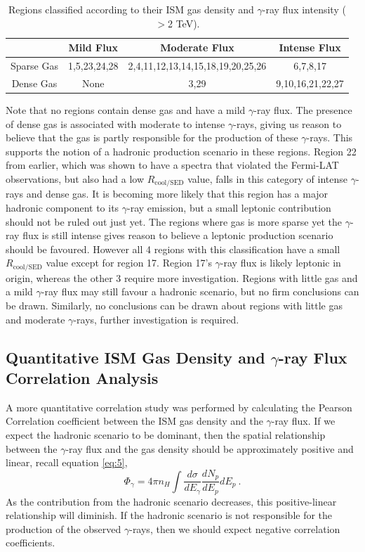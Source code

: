 \documentclass[12pt,a4paper]{article}
\begin{document}
\begin{table}[h] 
	\begin{center}
		\begin{tabular}{c|ccc}
			\toprule
			& Mild Flux  & Moderate Flux & Intense Flux \\
			\hline
			Sparse Gas &1,5,23,24,28&2,4,11,12,13,14,15,18,19,20,25,26&6,7,8,17\\
			Dense Gas & None & 3,29 & 9,10,16,21,22,27 \\
			\bottomrule
		\end{tabular} 
	\end{center}
	\caption{Regions classified according to their ISM gas density and $\gamma$-ray flux intensity ($>$2 TeV).}
	\label{tab:densgamclass}
\end{table}
Note that no regions contain dense gas and have a mild $\gamma$-ray flux. The presence of dense gas is associated with moderate to intense $\gamma$-rays, giving us reason to believe that the gas is partly responsible for the production of these $\gamma$-rays. This supports the notion of a hadronic production scenario in these regions. Region 22 from earlier, which was shown to have a spectra that violated the Fermi-LAT observations, but also had a low $R_{\mathrm{cool/SED}}$ value, falls in this category of intense $\gamma$-rays and dense gas. It is becoming more likely that this region has a major hadronic component to its $\gamma$-ray emission, but a small leptonic contribution should not be ruled out just yet. The regions where gas is more sparse yet the $\gamma$-ray flux is still intense gives reason to believe a leptonic production scenario should be favoured. However all 4 regions with this classification have a small $R_{\mathrm{cool/SED}}$ value except for region 17. Region 17's $\gamma$-ray flux is likely leptonic in origin, whereas the other 3 require more investigation. Regions with little gas and a mild $\gamma$-ray flux may still favour a hadronic scenario, but no firm conclusions can be drawn. Similarly, no conclusions can be drawn about regions with little gas and moderate $\gamma$-rays, further investigation is required. 

\subsection{Quantitative ISM Gas Density and $\gamma$-ray Flux Correlation Analysis} \label{sec:gasgamma}
A more quantitative correlation study was performed by calculating the Pearson Correlation coefficient between the ISM gas density and the $\gamma$-ray flux. 
If we expect the hadronic scenario to be dominant, then the spatial relationship between the $\gamma$-ray flux and the gas density should be approximately positive and linear, recall equation \ref{eq:5},
\begin{equation*} 
\Phi_{\gamma} = 4 \pi n_H \int \dfrac{d\sigma}{dE_\gamma} \dfrac{dN_p}{dE_p} dE_p \ .
\end{equation*}
As the contribution from the hadronic scenario decreases, this positive-linear relationship will diminish.
If the hadronic scenario is not responsible for the production of the observed $\gamma$-rays, then we should expect negative correlation coefficients. 
\end{document}
